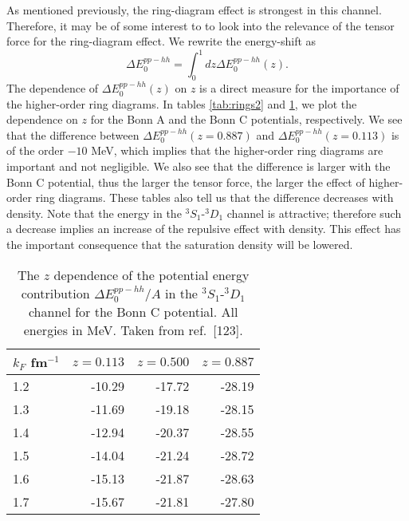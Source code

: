 As mentioned previously, the ring-diagram effect is strongest
in this channel. Therefore, it may be of some interest to to look into
the relevance of the tensor force for the ring-diagram effect. We rewrite
the energy-shift as
\begin{equation}
  \Delta E_0^{pp-hh}=\int_0^1dz\Delta E_0^{pp-hh}(z).
\end{equation}
The dependence of $\Delta E_0^{pp-hh}(z)$ on $z$ is a direct measure
for the importance of the higher-order ring diagrams. In tables
\ref{tab:rings2} and \ref{tab:rings3}, we plot the dependence on $z$ for the
Bonn A and the Bonn C potentials, respectively. We see that the difference
between $\Delta E_0^{pp-hh}(z=0.887)$ and $\Delta E_0^{pp-hh}(z=0.113)$ is 
of the order $-10$ MeV, which implies that the higher-order ring diagrams
are important and not negligible. We also see that the difference is larger
with the Bonn C potential, thus the larger the tensor force, the larger the
effect of higher-order ring diagrams. These tables also tell us that the
difference decreases with density. Note that the energy in the 
$^3S_1$-$^3D_1$ channel is attractive; therefore such a decrease implies
an increase of the repulsive effect with density. This effect has the
important consequence that the saturation density will be lowered.
\begin{table}[hbtp]
\caption{The $z$ dependence of the potential energy
contribution
$\Delta E_0^{pp-hh}/A$ in the $^{3}S_1$-$^{3}D_1$ channel
for the Bonn C potential. All energies in MeV. Taken from
ref.\ [123].}
\begin{center}
\begin{tabular}{lrrr}
\\\hline
\multicolumn{1}{c}{$k_F$ fm$^{-1}$}&
\multicolumn{1}{c}{$z=0.113$}&
\multicolumn{1}{c}{$z=0.500$}&
\multicolumn{1}{c}{$z=0.887$}
\\ \hline
1.2&-10.29&-17.72&-28.19\\
1.3&-11.69&-19.18&-28.15\\
1.4&-12.94&-20.37&-28.55\\
1.5&-14.04&-21.24&-28.72\\
1.6&-15.13&-21.87&-28.63\\
1.7&-15.67&-21.81&-27.80\\
\hline
\end{tabular}
\end{center}
\label{tab:rings3}
\end{table}





